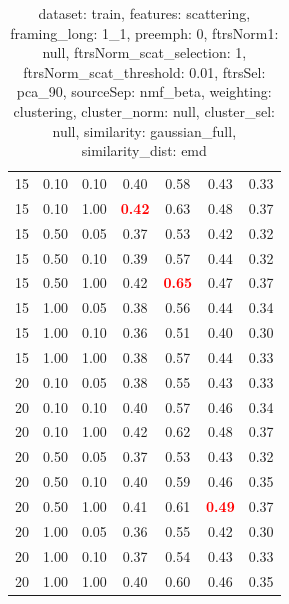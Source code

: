 \documentclass[12pt,a4paper,fleqn]{tufte-handout}
\begin{document}
\begin{table}
\begin{center}
\begin{tabular}{lllcccc}
15 & 0.10 & 0.10 & 0.40 & 0.58 & 0.43 & 0.33 \\                       
15 & 0.10 & 1.00 & \textbf{\textcolor{red}{0.42}} & 0.63 & 0.48 & 0.37 \\                       
15 & 0.50 & 0.05 & 0.37 & 0.53 & 0.42 & 0.32 \\                       
15 & 0.50 & 0.10 & 0.39 & 0.57 & 0.44 & 0.32 \\                       
15 & 0.50 & 1.00 & 0.42 & \textbf{\textcolor{red}{0.65}} & 0.47 & 0.37 \\                       
15 & 1.00 & 0.05 & 0.38 & 0.56 & 0.44 & 0.34 \\                       
15 & 1.00 & 0.10 & 0.36 & 0.51 & 0.40 & 0.30 \\                       
15 & 1.00 & 1.00 & 0.38 & 0.57 & 0.44 & 0.33 \\                       
20 & 0.10 & 0.05 & 0.38 & 0.55 & 0.43 & 0.33 \\                       
20 & 0.10 & 0.10 & 0.40 & 0.57 & 0.46 & 0.34 \\                       
20 & 0.10 & 1.00 & 0.42 & 0.62 & 0.48 & 0.37 \\                       
20 & 0.50 & 0.05 & 0.37 & 0.53 & 0.43 & 0.32 \\                       
20 & 0.50 & 0.10 & 0.40 & 0.59 & 0.46 & 0.35 \\                       
20 & 0.50 & 1.00 & 0.41 & 0.61 & \textbf{\textcolor{red}{0.49}} & 0.37 \\                       
20 & 1.00 & 0.05 & 0.36 & 0.55 & 0.42 & 0.30 \\                       
20 & 1.00 & 0.10 & 0.37 & 0.54 & 0.43 & 0.33 \\                       
20 & 1.00 & 1.00 & 0.40 & 0.60 & 0.46 & 0.35 \\                       
\end{tabular}                       
\end{center}                       
\caption{dataset: train, features: scattering, framing\_long: 1\_1, preemph: 0, ftrsNorm1: null, ftrsNorm\_scat\_selection: 1, ftrsNorm\_scat\_threshold: 0.01, ftrsSel: pca\_90, sourceSep: nmf\_beta, weighting: clustering, cluster\_norm: null, cluster\_sel: null, similarity: gaussian\_full, similarity\_dist: emd}                       
\label{datasetrFeaturscFraminlong1_1Preemp0Ftrsnorm1nuFtrsnoscatselect1Ftrsnoscatthresh0.01Ftrsselpc90SourcesepnmbeWeightclClustenormnuClusteselnuSimilagafuSimiladistem}                       
\end{table}                       
 
\end{document}

